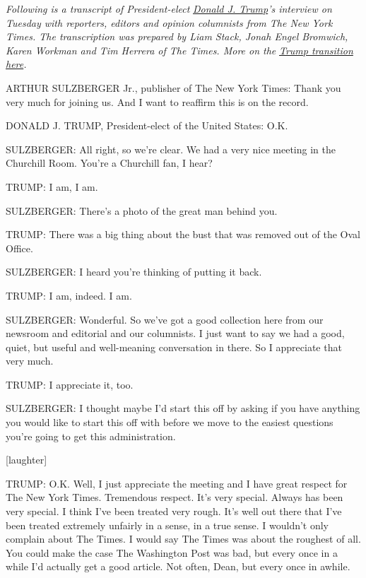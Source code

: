 \emph{Following is a transcript of President-elect}
\href{http://www.nytimes.com/topic/person/donald-trump?inline=nyt-per}{\emph{Donald
J. Trump}}\emph{'s interview on Tuesday with reporters, editors and
opinion columnists from The New York Times. The transcription was
prepared by Liam Stack, Jonah Engel Bromwich, Karen Workman and Tim
Herrera of The Times. More on the}
\href{http://nytimes.com/politics}{\emph{Trump transition here}}\emph{.}

ARTHUR SULZBERGER Jr., publisher of The New York Times: Thank you very
much for joining us. And I want to reaffirm this is on the record.

DONALD J. TRUMP, President-elect of the United States: O.K.

SULZBERGER: All right, so we're clear. We had a very nice meeting in the
Churchill Room. You're a Churchill fan, I hear?

TRUMP: I am, I am.

SULZBERGER: There's a photo of the great man behind you.

TRUMP: There was a big thing about the bust that was removed out of the
Oval Office.

SULZBERGER: I heard you're thinking of putting it back.

TRUMP: I am, indeed. I am.

SULZBERGER: Wonderful. So we've got a good collection here from our
newsroom and editorial and our columnists. I just want to say we had a
good, quiet, but useful and well-meaning conversation in there. So I
appreciate that very much.

TRUMP: I appreciate it, too.

SULZBERGER: I thought maybe I'd start this off by asking if you have
anything you would like to start this off with before we move to the
easiest questions you're going to get this administration.

{[}laughter{]}

TRUMP: O.K. Well, I just appreciate the meeting and I have great respect
for The New York Times. Tremendous respect. It's very special. Always
has been very special. I think I've been treated very rough. It's well
out there that I've been treated extremely unfairly in a sense, in a
true sense. I wouldn't only complain about The Times. I would say The
Times was about the roughest of all. You could make the case The
Washington Post was bad, but every once in a while I'd actually get a
good article. Not often, Dean, but every once in awhile.

